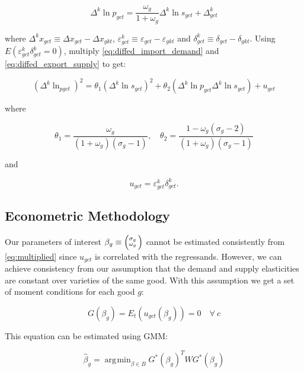 \documentclass[12pt,a4paper,hidelinks]{article}            %
\DeclareMathOperator*{\argmin}{arg\!\min}
\begin{document}
\begin{equation}\label{eq:diffed_export_supply}
    \Delta^k \ln{p_{gct}} = \frac{\omega_g}{1 + \omega_g} \Delta^k \ln{s_{gct}} + \Delta^k_{gct}
\end{equation}

where $\Delta^k x_{gct} \equiv \Delta x_{gct} - \Delta x_{gkt}$, $\varepsilon^k_{gct} \equiv \varepsilon_{gct} - \varepsilon_{gkt}$ and $\delta^k_{gct} \equiv \delta_{gct} - \delta_{gkt}$.
Using $E(\varepsilon_{gct}^k \delta^k_{gct} = 0)$, multiply \ref{eq:diffed_import_demand} and \ref{eq:diffed_export_supply} to get:

\begin{equation}
    (\Delta^k \ln_{pgct})^2 = \theta_1 (\Delta^k \ln s_{gct})^2 + \theta_2 (\Delta^k \ln{p_{gct}} \Delta^k\ln{s_{gct}}) + u_{gct}
\end{equation}

where

\begin{equation}\label{eq:multiplied}
    \theta_1 = \frac{\omega_g}{(1 + \omega_g) (\sigma_g - 1)}, \quad \theta_2 = \frac{1 - \omega_g(\sigma_g - 2)}{(1 + \omega_g)(\sigma_g - 1)}
\end{equation}

and

\begin{equation}
    u_{gct} = \varepsilon^k_{gct} \delta^k_{gct}.
\end{equation}

\subsection{Econometric Methodology}
\label{sub:econometric_methodology}


Our parameters of interest $\beta_g \equiv \Bigl(\negthinspace\begin{smallmatrix}\sigma_g\\\omega_g\end{smallmatrix}\Bigr)$ cannot be estimated consistently from \ref{eq:multiplied} since $u_{gct}$ is correlated with the regressands.  However, we can achieve consistency from our assumption that the demand and supply elasticities are constant over varieties of the same good.  With this assumption we get a set of moment conditions for each good $g$:

\begin{equation}
    G(\beta_g) = E_t(u_{gct}(\beta_g)) = 0 \quad \forall \ c
\end{equation}

This equation can be estimated using GMM:

\begin{equation}
    \hat{\beta}_g = \argmin_{\beta \in B} G^*(\beta_g)^{T} W G^*(\beta_g)
\end{equation}
\end{document}
